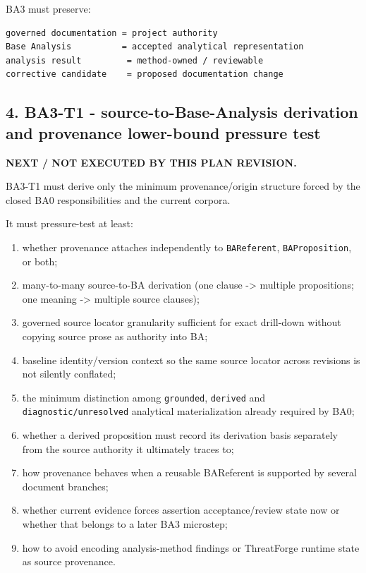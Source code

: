 \documentclass[11pt,a4paper]{article}
\providecommand{\tightlist}{\setlength{\itemsep}{0pt}\setlength{\parskip}{0pt}}
\begin{document}
BA3 must preserve:

\begin{verbatim}
governed documentation = project authority
Base Analysis          = accepted analytical representation
analysis result         = method-owned / reviewable
corrective candidate    = proposed documentation change
\end{verbatim}

\subsection{4. BA3-T1 - source-to-Base-Analysis derivation and provenance lower-bound pressure test}\label{ba3-t1---source-to-base-analysis-derivation-and-provenance-lower-bound-pressure-test}

\textbf{NEXT / NOT EXECUTED BY THIS PLAN REVISION.}

BA3-T1 must derive only the minimum provenance/origin structure forced by the closed BA0 responsibilities and the current corpora.

It must pressure-test at least:

\begin{enumerate}
\def\labelenumi{\arabic{enumi}.}
\tightlist
\item
  whether provenance attaches independently to \texttt{BAReferent}, \texttt{BAProposition}, or both;
\item
  many-to-many source-to-BA derivation (one clause -\textgreater{} multiple propositions; one meaning -\textgreater{} multiple source clauses);
\item
  governed source locator granularity sufficient for exact drill-down without copying source prose as authority into BA;
\item
  baseline identity/version context so the same source locator across revisions is not silently conflated;
\item
  the minimum distinction among \texttt{grounded}, \texttt{derived} and \texttt{diagnostic/unresolved} analytical materialization already required by BA0;
\item
  whether a derived proposition must record its derivation basis separately from the source authority it ultimately traces to;
\item
  how provenance behaves when a reusable BAReferent is supported by several document branches;
\item
  whether current evidence forces assertion acceptance/review state now or whether that belongs to a later BA3 microstep;
\item
  how to avoid encoding analysis-method findings or ThreatForge runtime state as source provenance.
\end{enumerate}
\end{document}
